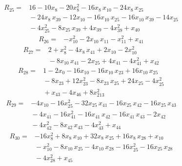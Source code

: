 \documentclass[11pt]{article}
\begin{document}
\begin{equation*}\begin{aligned}
R_{25}={}&16 - 10x_{8} - 20x_{8}^{2} - 16x_{8}\,x_{10} - 24x_{8}\,x_{25} \\
&{} - 24x_{8}\,x_{39} - 12x_{10} - 16x_{10}\,x_{25} - 16x_{10}\,x_{39} - 14x_{25} \\
&{} - 4x_{25}^{2} - 8x_{25}\,x_{39} + 4x_{39} - 4x_{39}^{2} + x_{40}
\end{aligned}\end{equation*}
\begin{equation*}\begin{aligned}
R_{26}={}&-x_{10}^{2} - 2x_{10}\,x_{11} - x_{11}^{2} + x_{41}
\end{aligned}\end{equation*}
\begin{equation*}\begin{aligned}
R_{27}={}&2 + x_{8}^{2} - 4x_{8}\,x_{41} + 2x_{10} - 2x_{10}^{2} \\
&{} - 8x_{10}\,x_{41} - 2x_{25} + 4x_{41} - 4x_{41}^{2} + x_{42}
\end{aligned}\end{equation*}
\begin{equation*}\begin{aligned}
R_{28}={}&1 - 2x_{0} - 16x_{10} - 16x_{10}\,x_{23} + 16x_{10}\,x_{25} \\
&{} - 8x_{23} + 12x_{23}^{2} - 8x_{23}\,x_{25} + 24x_{25} - 4x_{25}^{2} \\
&{} + x_{43} - 4x_{46} + 8x_{213}^{2}
\end{aligned}\end{equation*}
\begin{equation*}\begin{aligned}
R_{29}={}&-4x_{10} - 16x_{25}^{2} - 32x_{25}\,x_{41} - 16x_{25}\,x_{42} - 16x_{25}\,x_{43} \\
&{} - 4x_{41} - 16x_{41}^{2} - 16x_{41}\,x_{42} - 16x_{41}\,x_{43} - 2x_{42} \\
&{} - 4x_{42}^{2} - 8x_{42}\,x_{43} - 4x_{43}^{2} + x_{44}
\end{aligned}\end{equation*}
\begin{equation*}\begin{aligned}
R_{30}={}&-16x_{8}^{2} + 8x_{8}\,x_{10} + 32x_{8}\,x_{25} + 16x_{8}\,x_{28} + x_{10} \\
&{} - x_{10}^{2} - 8x_{10}\,x_{25} - 4x_{10}\,x_{28} - 16x_{25}^{2} - 16x_{25}\,x_{28} \\
&{} - 4x_{28}^{2} + x_{45}
\end{aligned}\end{equation*}
\end{document}
